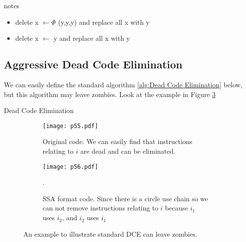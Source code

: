 \begin{note}{notes}
	\begin{itemize}
		\item  delete x $\gets \Phi$ (y,y,y) and replace all x with y
		\item delete x $\gets$ y and replace all x with y
	\end{itemize}
\end{note}



\subsection{Aggressive Dead Code Elimination}

We can easily define the standard algorithm \ref{alg:Dead Code Elimination} below, but this algorithm may leave zombies.
Look at the example in Figure \ref{fig:p55-56}


\begin{algorithm}[H]
	\caption{Dead Code Elimination}\label{alg:Dead Code Elimination}
	\begin{algorithmic}
		\EndIf
		\EndIf
		\EndIf
		\EndFor
		\EndWhile
	\end{algorithmic}
\end{algorithm}


\begin{figure}[H]
	\centering
	\begin{subfigure}{0.4\textwidth}
		\centering
		\texttt{[image: p55.pdf]}
		\caption{Original code. We can easily find that instructions relating to $i$ are dead and can be eliminated.}
		\label{fig:pp55}
	\end{subfigure}
	\begin{subfigure}{0.4\textwidth}
		\centering
		\texttt{[image: p56.pdf]}
		\caption{SSA format code. Since there is a circle use chain so we can not remove instructions relating to $i$ because $i_1$ uses $i_2$, and $i_2$ uses $i_1$}.
		\label{fig:p56}
	\end{subfigure}


	\caption{An example to illustrate standard DCE can leave zombies.}
	\label{fig:p55-56}
\end{figure}

